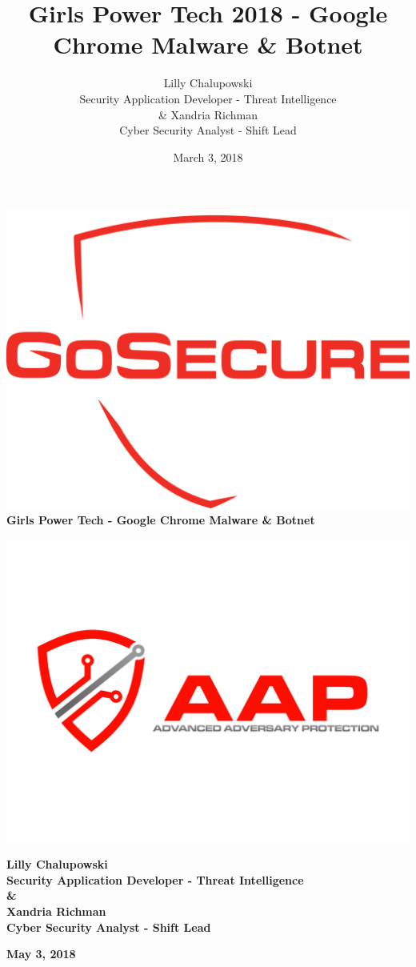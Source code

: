 \documentclass{article}
\title{Girls Power Tech 2018 - Google Chrome Malware \& Botnet}
\author{Lilly Chalupowski  \\
	Security Application Developer - Threat Intelligence  \\
	\& 
	Xandria Richman \\
	Cyber Security Analyst - Shift Lead \\
	}
\date{March 3, 2018}
\begin{document}
\begin{titlepage}
  \begin{center}
    \includegraphics[scale=0.05]{gosecure_logo}\\
    \bigskip
    \LARGE\textbf{Girls Power Tech - Google Chrome Malware \& Botnet}\\
  \end{center}
   \begin{center}
     \includegraphics[scale=0.3]{aap_logo}
   \end{center}
   \begin{center}
     \small\textbf{Lilly Chalupowski\\
      Security Application Developer - Threat Intelligence\\
      \smallskip
      \&\\
      \smallskip
      Xandria Richman\\
      Cyber Security Analyst - Shift Lead
    }\\
  \end{center}
  \begin{center}
    \large\textbf{May 3, 2018}
  \end{center}
\end{titlepage}
\end{document}
